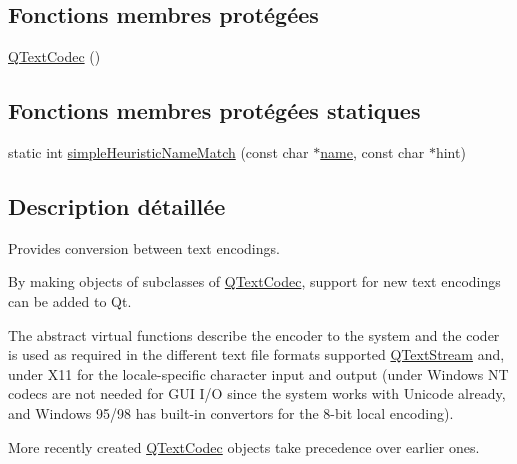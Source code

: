 \subsection*{Fonctions membres protégées}
\begin{DoxyCompactItemize}
\item 
\hyperlink{class_q_text_codec_a237562a5481646e6f1c7656a1156719f}{Q\+Text\+Codec} ()
\end{DoxyCompactItemize}
\subsection*{Fonctions membres protégées statiques}
\begin{DoxyCompactItemize}
\item 
static int \hyperlink{class_q_text_codec_a16459bb8c9e7c502547f45e5387fbb03}{simple\+Heuristic\+Name\+Match} (const char $\ast$\hyperlink{class_q_text_codec_ab4e991cacb9c6acff167c4f8d4f2ec3e}{name}, const char $\ast$hint)
\end{DoxyCompactItemize}


\subsection{Description détaillée}
Provides conversion between text encodings. 

By making objects of subclasses of \hyperlink{class_q_text_codec}{Q\+Text\+Codec}, support for new text encodings can be added to Qt.

The abstract virtual functions describe the encoder to the system and the coder is used as required in the different text file formats supported \hyperlink{class_q_text_stream}{Q\+Text\+Stream} and, under X11 for the locale-\/specific character input and output (under Windows N\+T codecs are not needed for G\+U\+I I/\+O since the system works with Unicode already, and Windows 95/98 has built-\/in convertors for the 8-\/bit local encoding).

More recently created \hyperlink{class_q_text_codec}{Q\+Text\+Codec} objects take precedence over earlier ones.

